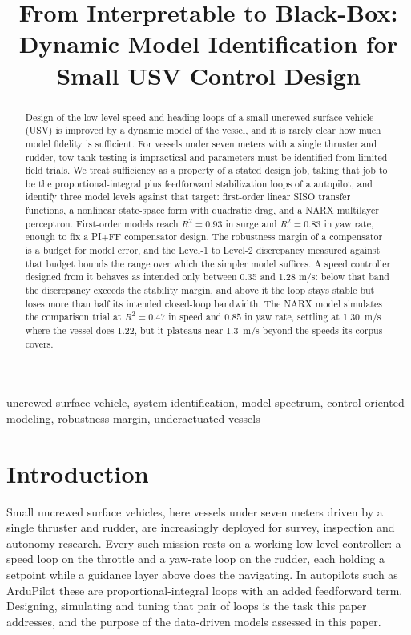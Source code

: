 \documentclass[conference]{IEEEtran}
\title{From Interpretable to Black-Box: Dynamic Model Identification
for Small USV Control Design}
\author{
  \IEEEauthorblockN{Brian S. Bingham and Carson Vogt}
  \IEEEauthorblockA{
    Department of Mechanical and Aerospace Engineering\\
    Naval Postgraduate School\\
    Monterey, CA, USA\\
    bbingham@nps.edu, crvogt@nps.edu
  }
}
\begin{document}
\maketitle

\begin{abstract}
Design of the low-level speed and heading loops of a small uncrewed surface vehicle (USV) is improved by a dynamic model of the vessel, and it is rarely clear how much model fidelity is sufficient. For vessels under seven meters with a single thruster and rudder, tow-tank testing is impractical and parameters must be identified from limited field trials. We treat sufficiency as a property of a stated design job, taking that job to be the proportional-integral plus feedforward stabilization loops of a  autopilot, and identify three model levels against that target: first-order linear SISO transfer functions, a nonlinear state-space form with quadratic drag, and a NARX multilayer perceptron. First-order models reach $R^2=0.93$ in surge and $R^2=0.83$ in yaw rate, enough to fix a PI+FF compensator design. The robustness margin of a compensator is a budget for model error, and the Level-1 to Level-2 discrepancy measured against that budget bounds the range over which the simpler model suffices. A speed controller designed from it behaves as intended only between 0.35 and 1.28 m/s: below that band the discrepancy exceeds the stability margin, and above it the loop stays stable but loses more than half its intended closed-loop bandwidth. The NARX model simulates the comparison trial at $R^2=0.47$ in speed and $0.85$ in yaw rate, settling at 1.30~m/s where the vessel does 1.22, but it plateaus near 1.3~m/s beyond the speeds its corpus covers. 
\end{abstract}

\begin{IEEEkeywords}
uncrewed surface vehicle, system identification, model spectrum, control-oriented
modeling, robustness margin, underactuated vessels
\end{IEEEkeywords}

\section{Introduction}
\label{sec:intro}

Small uncrewed surface vehicles, here vessels under seven meters driven by a single thruster and rudder, are increasingly deployed for survey, inspection and autonomy research. Every such mission rests on a working low-level controller: a speed loop on the throttle and a yaw-rate loop on the rudder, each holding a setpoint while a guidance layer above does the navigating. In autopilots such as ArduPilot these are proportional-integral loops with an added feedforward term. Designing, simulating and tuning that pair of loops is the task this paper addresses, and the purpose of the data-driven models assessed in this paper.  
\end{document}
